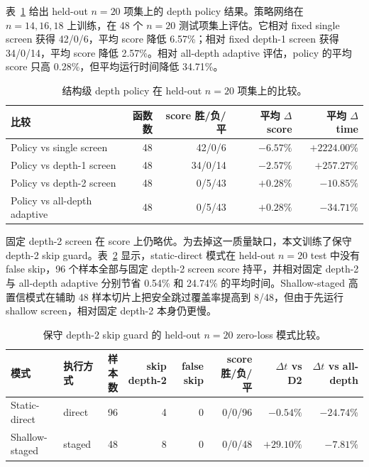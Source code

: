 \documentclass[UTF8,fontset=macnew,11pt]{ctexart}
\begin{document}
表~\ref{tab:policy} 给出 held-out $n=20$ 项集上的 depth policy 结果。策略网络在 $n=14,16,18$ 上训练，在 48 个 $n=20$ 测试项集上评估。它相对 fixed single screen 获得 42/0/6，平均 score 降低 6.57\%；相对 fixed depth-1 screen 获得 34/0/14，平均 score 降低 2.57\%。相对 all-depth adaptive 评估，policy 的平均 score 只高 0.28\%，但平均运行时间降低 34.71\%。

\begin{table}[t]
\centering
\small
\caption{结构级 depth policy 在 held-out $n=20$ 项集上的比较。}
\label{tab:policy}
\begin{tabular}{lrrrr}
\toprule
比较 & 函数数 & score 胜/负/平 & 平均 $\Delta$ score & 平均 $\Delta$ time \\
\midrule
Policy vs single screen & 48 & 42/0/6 & $-6.57\%$ & $+2224.00\%$ \\
Policy vs depth-1 screen & 48 & 34/0/14 & $-2.57\%$ & $+257.27\%$ \\
Policy vs depth-2 screen & 48 & 0/5/43 & $+0.28\%$ & $-10.85\%$ \\
Policy vs all-depth adaptive & 48 & 0/5/43 & $+0.28\%$ & $-34.71\%$ \\
\bottomrule
\end{tabular}
\end{table}

固定 depth-2 screen 在 score 上仍略优。为去掉这一质量缺口，本文训练了保守 depth-2 skip guard。表~\ref{tab:guard} 显示，static-direct 模式在 held-out $n=20$ test 中没有 false skip，96 个样本全部与固定 depth-2 screen score 持平，并相对固定 depth-2 与 all-depth adaptive 分别节省 0.54\% 和 24.74\% 的平均时间。Shallow-staged 高置信模式在辅助 48 样本切片上把安全跳过覆盖率提高到 8/48，但由于先运行 shallow screen，相对固定 depth-2 本身仍更慢。

\begin{table}[t]
\centering
\scriptsize
\caption{保守 depth-2 skip guard 的 held-out $n=20$ zero-loss 模式比较。}
\label{tab:guard}
\begin{tabular}{llrrrrrr}
\toprule
模式 & 执行方式 & 样本数 & skip depth-2 & false skip & score 胜/负/平 & $\Delta t$ vs D2 & $\Delta t$ vs all-depth \\
\midrule
Static-direct & direct & 96 & 4 & 0 & 0/0/96 & $-0.54\%$ & $-24.74\%$ \\
Shallow-staged & staged & 48 & 8 & 0 & 0/0/48 & $+29.10\%$ & $-7.81\%$ \\
\bottomrule
\end{tabular}
\end{table}
\end{document}
